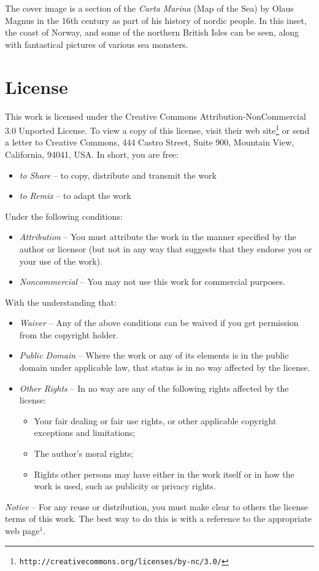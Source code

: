 \documentclass[11pt]{report}
\numberwithin{equation}{section}
\begin{document}
The cover image is a section of the {\it Carta Marina} (Map of the Sea) by Olaus Magnus in the 16th century as part of his history of nordic people.  In this inset, the coast of Norway, and some of the northern British Isles can be seen, along with fantastical pictures of various sea monsters.

\section*{License}

This work is licensed under the Creative Commons Attribution-NonCommercial 3.0 Unported License. To view a copy of this license, visit their web site\footnote{\tt http://creativecommons.org/licenses/by-nc/3.0/} or send a letter to Creative Commons, 444 Castro Street, Suite 900, Mountain View, California, 94041, USA.  In short, you are free:
\begin{itemize}
    \item \emph{to Share} -- to copy, distribute and transmit the work
    \item \emph{to Remix} -- to adapt the work 
\end{itemize}
Under the following conditions:
\begin{itemize}
    \item \emph{Attribution} -- You must attribute the work in the manner specified by the author or licensor (but not in any way that suggests that they endorse you or your use of the work).
    \item \emph{Noncommercial} -- You may not use this work for commercial purposes.
\end{itemize}
With the understanding that:
\begin{itemize}
    \item \emph{Waiver} -- Any of the above conditions can be waived if you get permission from the copyright holder.
    \item \emph{Public Domain} -- Where the work or any of its elements is in the public domain under applicable law, that status is in no way affected by the license.
    \item \emph{Other Rights} -- In no way are any of the following rights affected by the license:
    \begin{itemize}
        \item Your fair dealing or fair use rights, or other applicable copyright exceptions and limitations;
        \item The author's moral rights;
        \item Rights other persons may have either in the work itself or in how the work is used, such as publicity or privacy rights.
    \end{itemize}
\end{itemize}
\emph{Notice} -- For any reuse or distribution, you must make clear to others the license terms of this work. The best way to do this is with a reference to the appropriate web page$^{1}$.
\end{document}
